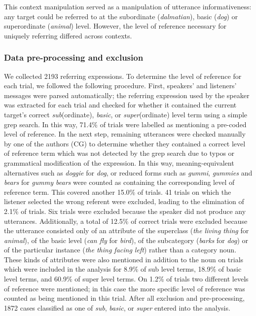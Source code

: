 \documentclass[11pt]{article}
\begin{document}
This context manipulation served as a manipulation of utterance informativeness: any target could be referred to at the subordinate (\emph{dalmatian}), basic (\emph{dog}) or superordinate (\emph{animal}) level. However, the level of reference necessary for uniquely referring differed across contexts.


\subsubsection{Data pre-processing and exclusion}

We collected 2193 referring expressions. To determine the level of reference for each trial, we followed the following procedure. First, speakers' and listeners' messages were parsed automatically; the referring expression used by the speaker was extracted for each trial and checked for whether it contained the current target's correct \emph{sub}(ordinate), \emph{basic}, or \emph{super}(ordinate) level term using a simple grep search. In this way, 71.4\% of trials were labelled as mentioning a pre-coded level of reference. In the next step, remaining utterances were checked manually by one of the authors (CG) to determine whether they contained a correct level of reference term which was not detected by the grep search due to typos or grammatical modification of the expression. In this way, meaning-equivalent alternatives such as \emph{doggie} for \emph{dog}, or reduced forms such as \emph{gummi}, \emph{gummies} and \emph{bears} for \emph{gummy bears} were counted as containing the corresponding level of reference term. This covered another 15.0\% of trials. 41 trials on which the listener selected the wrong referent were excluded, leading to the elimination of 2.1\% of trials. Six trials were excluded because the speaker did not produce any utterances. Additionally, a total of 12.5\% of correct trials were excluded because the utterance consisted only of an attribute of the superclass (\emph{the living thing} for \emph{animal}), of the basic level (\emph{can fly} for \emph{bird}), of the subcategory (\emph{barks} for \emph{dog}) or of the particular instance (\emph{the thing facing left}) rather than a category noun. These kinds of attributes were also mentioned in addition to the noun on trials which were included in the analysis for 8.9\% of sub level terms, 18.9\% of basic level terms, and 60.9\% of super level terms. On 1.2\% of trials two different levels of reference were mentioned; in this case the more specific level of reference was counted as being mentioned in this trial. After all exclusion and pre-processing, 1872 cases classified as one of \emph{sub}, \emph{basic}, or \emph{super} entered into the analysis.
\end{document}
